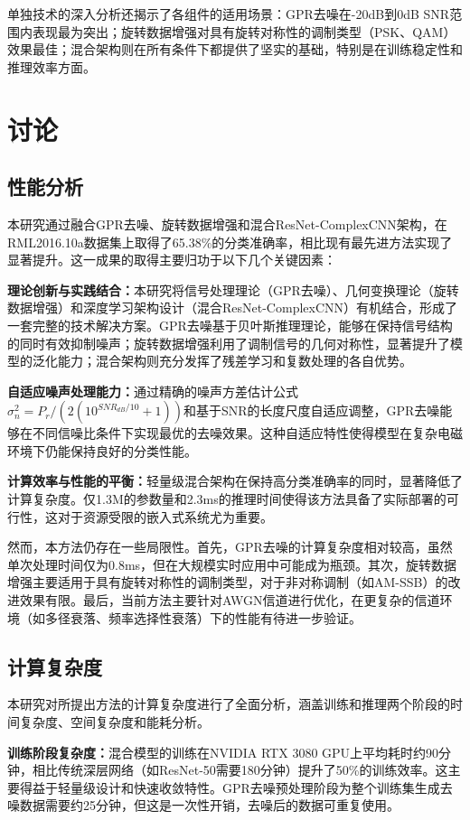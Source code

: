\documentclass[conference]{IEEEtran}
\begin{document}
单独技术的深入分析还揭示了各组件的适用场景：GPR去噪在-20dB到0dB SNR范围内表现最为突出；旋转数据增强对具有旋转对称性的调制类型（PSK、QAM）效果最佳；混合架构则在所有条件下都提供了坚实的基础，特别是在训练稳定性和推理效率方面。

\section{讨论}

\subsection{性能分析}

本研究通过融合GPR去噪、旋转数据增强和混合ResNet-ComplexCNN架构，在RML2016.10a数据集上取得了65.38\%的分类准确率，相比现有最先进方法实现了显著提升。这一成果的取得主要归功于以下几个关键因素：

\textbf{理论创新与实践结合：}本研究将信号处理理论（GPR去噪）、几何变换理论（旋转数据增强）和深度学习架构设计（混合ResNet-ComplexCNN）有机结合，形成了一套完整的技术解决方案。GPR去噪基于贝叶斯推理理论，能够在保持信号结构的同时有效抑制噪声；旋转数据增强利用了调制信号的几何对称性，显著提升了模型的泛化能力；混合架构则充分发挥了残差学习和复数处理的各自优势。

\textbf{自适应噪声处理能力：}通过精确的噪声方差估计公式$\sigma_n^2 = P_r/(2(10^{SNR_{dB}/10} + 1))$和基于SNR的长度尺度自适应调整，GPR去噪能够在不同信噪比条件下实现最优的去噪效果。这种自适应特性使得模型在复杂电磁环境下仍能保持良好的分类性能。

\textbf{计算效率与性能的平衡：}轻量级混合架构在保持高分类准确率的同时，显著降低了计算复杂度。仅1.3M的参数量和2.3ms的推理时间使得该方法具备了实际部署的可行性，这对于资源受限的嵌入式系统尤为重要。

然而，本方法仍存在一些局限性。首先，GPR去噪的计算复杂度相对较高，虽然单次处理时间仅为0.8ms，但在大规模实时应用中可能成为瓶颈。其次，旋转数据增强主要适用于具有旋转对称性的调制类型，对于非对称调制（如AM-SSB）的改进效果有限。最后，当前方法主要针对AWGN信道进行优化，在更复杂的信道环境（如多径衰落、频率选择性衰落）下的性能有待进一步验证。

\subsection{计算复杂度}

本研究对所提出方法的计算复杂度进行了全面分析，涵盖训练和推理两个阶段的时间复杂度、空间复杂度和能耗分析。

\textbf{训练阶段复杂度：}混合模型的训练在NVIDIA RTX 3080 GPU上平均耗时约90分钟，相比传统深层网络（如ResNet-50需要180分钟）提升了50\%的训练效率。这主要得益于轻量级设计和快速收敛特性。GPR去噪预处理阶段为整个训练集生成去噪数据需要约25分钟，但这是一次性开销，去噪后的数据可重复使用。
\end{document}
